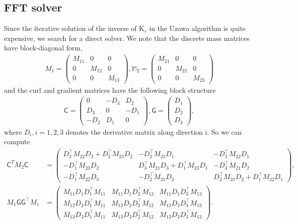\documentclass[12pt,a4paper,twoside]{article}
\newcommand{\K}{\mathrm{K}}
\newcommand{\M}{\ensuremath{\mathbb{M}}}
\newcommand{\C}{\ensuremath{\mathsf{C}}}
\newcommand{\G}{\ensuremath{\mathsf{G}}}
\numberwithin{equation}{section}
\begin{document}
\subsection{FFT solver}
Since the iterative solution of the inverse of $\K_r$ in the Uzawa algorithm is quite expensive, we search for a direct solver. We note that the discrete mass matrices have block-diagonal form,
\begin{align*}
M_1 = \begin{pmatrix}
M_{11}& 0 &0 \\ 0&M_{12}&0 \\ 0&0&M_{13}
\end{pmatrix}, \M_2 = \begin{pmatrix}
M_{21}& 0 &0 \\ 0&M_{22}&0 \\ 0&0&M_{23}
\end{pmatrix}
\end{align*}
and the curl and gradient matrices have the following block structure
\begin{align*}
\C= \begin{pmatrix}
0& -D_3 & D_2 \\ D_3&0&-D_1 \\ -D_2&D_1&0
\end{pmatrix}, \G= \begin{pmatrix}
D_1 \\ D_2 \\ D_3
\end{pmatrix},
\end{align*}
where $D_i, i=1,2,3$ denotes the derivative matrix along direction i. So we can compute
\begin{align*}
\C^T M_2 \C &= \begin{pmatrix}
D_3^\top M_{22} D_3 + D_2^\top M_{23} D_2 & -D_2^\top M_{23}D_1& -D_3^\top M_{22}D_1
\\
-D_1^\top M_{23}D_2 &D_3^\top M_{21} D_3 + D_1^\top M_{23} D_1 & -D_3^\top M_{21}D_2 
 \\
-D_1^\top M_{22}D_3 & -D_2^\top M_{21}D_3&D_2^\top M_{21} D_2 + D_1^\top M_{22} D_1
\end{pmatrix},\\
M_1 \G \G^\top M_1 &= \begin{pmatrix}
M_{11}D_1 D_1^\top M_{11} & M_{11}D_1 D_2^\top M_{12} &M_{11}D_1 D_3^\top M_{13} 
\\
M_{12}D_2 D_1^\top M_{11} & M_{12}D_2 D_2^\top M_{12} & M_{12}D_2 D_3^\top M_{13} 
\\
M_{13}D_3 D_1^\top M_{11} & M_{13}D_3 D_2^\top M_{12} & M_{13}D_3 D_3^\top M_{13}
\end{pmatrix}. 
\end{align*}
\end{document}
